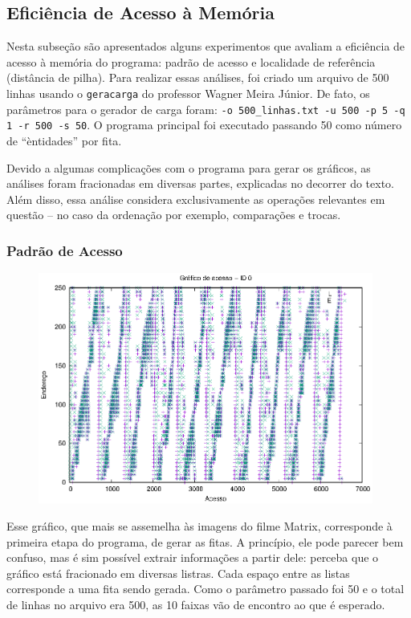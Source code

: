 \documentclass{article}
\def\code#1{\texttt{#1}}
\begin{document}
\subsection{Eficiência de Acesso à Memória}

Nesta subseção são apresentados alguns experimentos que avaliam a eficiência de acesso à memória do programa: padrão de acesso e localidade de referência (distância de pilha). Para realizar essas análises, foi criado um arquivo de 500 linhas usando o \code{geracarga} do professor Wagner Meira Júnior. De fato, os parâmetros para o gerador de carga foram: \code{-o 500\_linhas.txt -u 500 -p 5 -q 1 -r 500 -s 50}. O programa principal foi executado passando 50 como número de ``èntidades'' por fita.

Devido a algumas complicações com o programa para gerar os gráficos, as análises foram fracionadas em diversas partes, explicadas no decorrer do texto. Além disso, essa análise considera exclusivamente as operações relevantes em questão -- no caso da ordenação por exemplo, comparações e trocas.

\subsubsection{Padrão de Acesso}

\begin{figure}[H]
	\includegraphics[width=11cm]{1a-fase-acesso-0.eps}
	\centering
\end{figure}

Esse gráfico, que mais se assemelha às imagens do filme Matrix, corresponde à primeira etapa do programa, de gerar as fitas. A princípio, ele pode parecer bem confuso, mas é sim possível extrair informações a partir dele: perceba que o gráfico está fracionado em diversas listras. Cada espaço entre as listas corresponde a uma fita sendo gerada. Como o parâmetro passado foi 50 e o total de linhas no arquivo era 500, as 10 faixas vão de encontro ao que é esperado.
\end{document}
